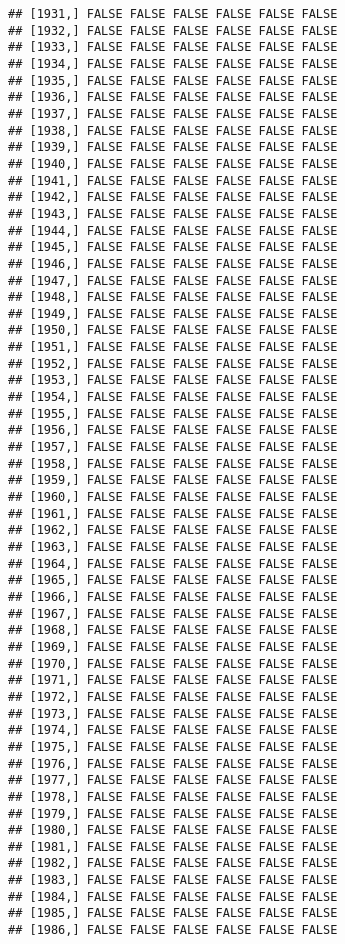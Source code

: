 \documentclass[
]{article}
\begin{document}
\begin{verbatim}
## [1931,] FALSE FALSE FALSE FALSE FALSE FALSE
## [1932,] FALSE FALSE FALSE FALSE FALSE FALSE
## [1933,] FALSE FALSE FALSE FALSE FALSE FALSE
## [1934,] FALSE FALSE FALSE FALSE FALSE FALSE
## [1935,] FALSE FALSE FALSE FALSE FALSE FALSE
## [1936,] FALSE FALSE FALSE FALSE FALSE FALSE
## [1937,] FALSE FALSE FALSE FALSE FALSE FALSE
## [1938,] FALSE FALSE FALSE FALSE FALSE FALSE
## [1939,] FALSE FALSE FALSE FALSE FALSE FALSE
## [1940,] FALSE FALSE FALSE FALSE FALSE FALSE
## [1941,] FALSE FALSE FALSE FALSE FALSE FALSE
## [1942,] FALSE FALSE FALSE FALSE FALSE FALSE
## [1943,] FALSE FALSE FALSE FALSE FALSE FALSE
## [1944,] FALSE FALSE FALSE FALSE FALSE FALSE
## [1945,] FALSE FALSE FALSE FALSE FALSE FALSE
## [1946,] FALSE FALSE FALSE FALSE FALSE FALSE
## [1947,] FALSE FALSE FALSE FALSE FALSE FALSE
## [1948,] FALSE FALSE FALSE FALSE FALSE FALSE
## [1949,] FALSE FALSE FALSE FALSE FALSE FALSE
## [1950,] FALSE FALSE FALSE FALSE FALSE FALSE
## [1951,] FALSE FALSE FALSE FALSE FALSE FALSE
## [1952,] FALSE FALSE FALSE FALSE FALSE FALSE
## [1953,] FALSE FALSE FALSE FALSE FALSE FALSE
## [1954,] FALSE FALSE FALSE FALSE FALSE FALSE
## [1955,] FALSE FALSE FALSE FALSE FALSE FALSE
## [1956,] FALSE FALSE FALSE FALSE FALSE FALSE
## [1957,] FALSE FALSE FALSE FALSE FALSE FALSE
## [1958,] FALSE FALSE FALSE FALSE FALSE FALSE
## [1959,] FALSE FALSE FALSE FALSE FALSE FALSE
## [1960,] FALSE FALSE FALSE FALSE FALSE FALSE
## [1961,] FALSE FALSE FALSE FALSE FALSE FALSE
## [1962,] FALSE FALSE FALSE FALSE FALSE FALSE
## [1963,] FALSE FALSE FALSE FALSE FALSE FALSE
## [1964,] FALSE FALSE FALSE FALSE FALSE FALSE
## [1965,] FALSE FALSE FALSE FALSE FALSE FALSE
## [1966,] FALSE FALSE FALSE FALSE FALSE FALSE
## [1967,] FALSE FALSE FALSE FALSE FALSE FALSE
## [1968,] FALSE FALSE FALSE FALSE FALSE FALSE
## [1969,] FALSE FALSE FALSE FALSE FALSE FALSE
## [1970,] FALSE FALSE FALSE FALSE FALSE FALSE
## [1971,] FALSE FALSE FALSE FALSE FALSE FALSE
## [1972,] FALSE FALSE FALSE FALSE FALSE FALSE
## [1973,] FALSE FALSE FALSE FALSE FALSE FALSE
## [1974,] FALSE FALSE FALSE FALSE FALSE FALSE
## [1975,] FALSE FALSE FALSE FALSE FALSE FALSE
## [1976,] FALSE FALSE FALSE FALSE FALSE FALSE
## [1977,] FALSE FALSE FALSE FALSE FALSE FALSE
## [1978,] FALSE FALSE FALSE FALSE FALSE FALSE
## [1979,] FALSE FALSE FALSE FALSE FALSE FALSE
## [1980,] FALSE FALSE FALSE FALSE FALSE FALSE
## [1981,] FALSE FALSE FALSE FALSE FALSE FALSE
## [1982,] FALSE FALSE FALSE FALSE FALSE FALSE
## [1983,] FALSE FALSE FALSE FALSE FALSE FALSE
## [1984,] FALSE FALSE FALSE FALSE FALSE FALSE
## [1985,] FALSE FALSE FALSE FALSE FALSE FALSE
## [1986,] FALSE FALSE FALSE FALSE FALSE FALSE

\end{verbatim}
\end{document}
